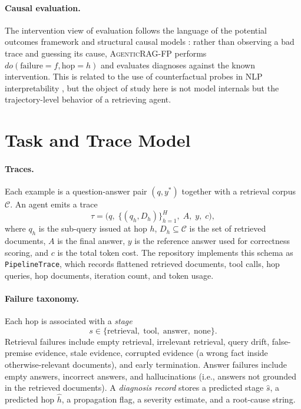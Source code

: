 \documentclass[11pt]{article}
\newcommand{\ours}{\textnormal{\textsc{AgenticRAG-FP}}}
\begin{document}
\paragraph{Causal evaluation.}
The intervention view of evaluation follows the language of the potential
outcomes framework and structural causal models \citep{pearl2009causality}:
rather than observing a bad trace and guessing its cause, \ours{} performs
$do(\mathrm{failure}{=}f, \mathrm{hop}{=}h)$ and evaluates diagnoses against
the known intervention.  This is related to the use of counterfactual probes in
NLP interpretability \citep{feder2022causal}, but the object of study here is
not model internals but the trajectory-level behavior of a retrieving agent.

\section{Task and Trace Model}
\label{sec:task}

\paragraph{Traces.}
Each example is a question-answer pair $(q, y^*)$ together with a retrieval
corpus $\mathcal{C}$.  An agent emits a trace
\[
  \tau = \bigl(q,\; \{(q_h, D_h)\}_{h=1}^{H},\; A,\; y,\; c\bigr),
\]
where $q_h$ is the sub-query issued at hop $h$, $D_h \subseteq \mathcal{C}$ is
the set of retrieved documents, $A$ is the final answer, $y$ is the reference
answer used for correctness scoring, and $c$ is the total token cost.  The
repository implements this schema as \texttt{PipelineTrace}, which records
flattened retrieved documents, tool calls, hop queries, hop documents,
iteration count, and token usage.

\paragraph{Failure taxonomy.}
Each hop is associated with a \emph{stage}
\[
  s \in \{\mathrm{retrieval},\; \mathrm{tool},\; \mathrm{answer},\; \mathrm{none}\}.
\]
Retrieval failures include empty retrieval, irrelevant retrieval, query drift,
false-premise evidence, stale evidence, corrupted evidence (a wrong fact inside
otherwise-relevant documents), and early termination.  Answer failures
include empty answers, incorrect answers, and hallucinations (i.e., answers
not grounded in the retrieved documents).  A \emph{diagnosis record} stores a
predicted stage $\hat{s}$, a predicted hop $\hat{h}$, a propagation flag, a
severity estimate, and a root-cause string.
\end{document}
